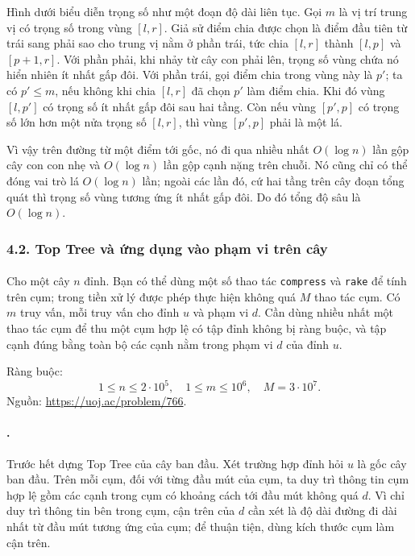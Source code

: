 \documentclass[11pt]{article}
\begin{document}
Hình dưới biểu diễn trọng số như một đoạn độ dài liên tục. Gọi \(m\) là vị trí
trung vị có trọng số trong vùng \([l,r]\). Giả sử điểm chia được chọn
là điểm đầu tiên từ trái sang phải sao cho trung vị nằm ở phần trái, tức chia
\([l,r]\) thành \([l,p]\) và \([p+1,r]\). Với phần phải, khi nhảy từ cây con
phải lên, trọng số vùng chứa nó hiển nhiên ít nhất gấp đôi. Với phần trái, gọi
điểm chia trong vùng này là \(p'\); ta có \(p'\le m\), nếu không khi chia
\([l,r]\) đã chọn \(p'\) làm điểm chia. Khi đó vùng \([l,p']\) có trọng số ít
nhất gấp đôi sau hai tầng. Còn nếu vùng \([p',p]\) có trọng số lớn hơn một nửa
trọng số \([l,r]\), thì vùng \([p',p]\) phải là một lá.


Vì vậy trên đường từ một điểm tới gốc, nó đi qua nhiều nhất \(O(\log n)\) lần
gộp cây con con nhẹ và \(O(\log n)\) lần gộp cạnh nặng trên chuỗi. Nó cũng chỉ
có thể đóng vai trò lá \(O(\log n)\) lần; ngoài các lần đó, cứ hai tầng trên
cây đoạn tổng quát thì trọng số vùng tương ứng ít nhất gấp đôi. Do đó tổng độ
sâu là \(O(\log n)\).

\subsubsection*{4.2. Top Tree và ứng dụng vào phạm vi trên cây}

\paragraph{}
Cho một cây \(n\) đỉnh. Bạn có thể dùng một số thao tác \texttt{compress} và
\texttt{rake} để tính trên cụm; trong tiền xử lý được phép thực hiện không quá
\(M\) thao tác cụm. Có \(m\) truy vấn, mỗi truy vấn cho đỉnh \(u\) và phạm vi
\(d\). Cần dùng nhiều nhất một thao tác cụm để thu một cụm hợp lệ có tập đỉnh
không bị ràng buộc, và tập cạnh đúng bằng toàn bộ các cạnh nằm trong phạm vi
\(d\) của đỉnh \(u\).

Ràng buộc:
\[
  1\le n\le 2\cdot 10^5,\quad
  1\le m\le 10^6,\quad
  M=3\cdot 10^7.
\]
Nguồn: \url{https://uoj.ac/problem/766}.

\paragraph{.}
Trước hết dựng Top Tree của cây ban đầu. Xét trường hợp đỉnh hỏi \(u\) là gốc
cây ban đầu. Trên mỗi cụm, đối với từng đầu mút của cụm, ta duy trì thông tin
cụm hợp lệ gồm các cạnh trong cụm có khoảng cách tới đầu mút không quá \(d\).
Vì chỉ duy trì thông tin bên trong cụm, cận trên của \(d\) cần xét là độ dài
đường đi dài nhất từ đầu mút tương ứng của cụm; để thuận tiện, dùng kích thước
cụm làm cận trên.
\end{document}
